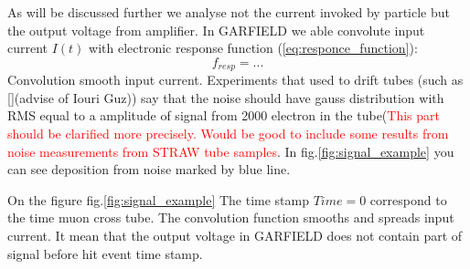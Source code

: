 \documentclass[]{article}
\begin{document}
	As will be discussed further we analyse not the current invoked by particle but the output voltage from amplifier. In GARFIELD we able convolute input current $I(t)$ with electronic response function (\ref{eq:responce_function}): 
	\begin{equation}
	f_{resp} =  ... 
	\label{eq:responce_function}
	\end{equation}		
	Convolution smooth input current. Experiments that used to drift tubes (such as \ref{}(advise of Iouri Guz)) say that the noise should have gauss distribution with RMS equal to a amplitude of signal from 2000 electron in the tube(\textcolor{red}{This part should be clarified more precisely. Would be good to include some results from noise measurements from STRAW tube samples}. In fig.\ref{fig:signal_example} you can see deposition from noise marked by blue line.
	

	On the figure fig.\ref{fig:signal_example} The time stamp $Time=0$ correspond to the time muon cross tube. The convolution function smooths and spreads input current. It mean that the output voltage in GARFIELD does not contain part of signal before hit event time stamp. 

	
\end{document}
